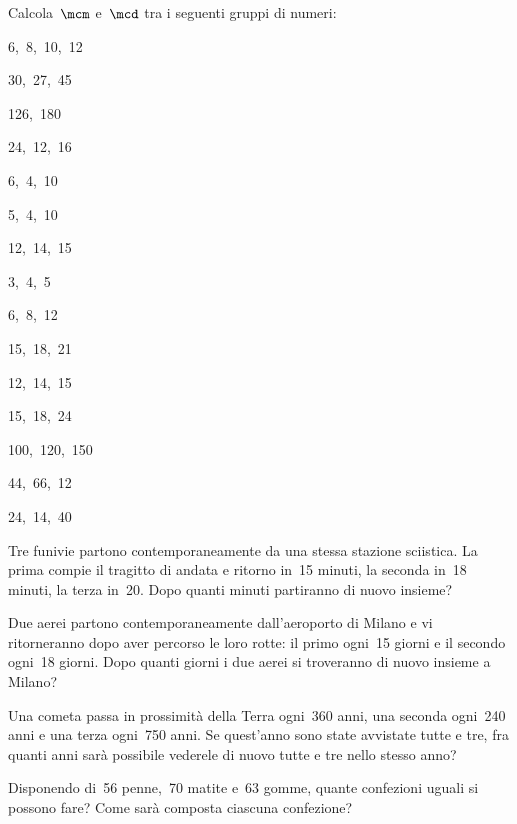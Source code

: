 \begin{esercizio}[\Ast]
\label{ese:1.22}
Calcola~$\mcm$ e~$\mcd$ tra i seguenti gruppi di numeri:
\begin{multicols}{3}
 \begin{enumeratea}
 \item 6,~8,~10,~12
 \item 30,~27,~45
 \item 126,~180
 \item 24,~12,~16
 \item 6,~4,~10
 \item 5,~4,~10
 \item 12,~14,~15
 \item 3,~4,~5
 \item 6,~8,~12
 \item 15,~18,~21
 \item 12,~14,~15
 \item 15,~18,~24
 \item 100,~120,~150
 \item 44,~66,~12
 \item 24,~14,~40
 \end{enumeratea}
\end{multicols}
\end{esercizio}

\begin{multicols}{2}
\begin{esercizio}[\Ast]
\label{ese:1.23}
 Tre funivie partono contemporaneamente da una stessa stazione sciistica. La prima compie il tragitto di
andata e ritorno in~15 minuti, la seconda in~18 minuti, la terza in~20. Dopo quanti minuti partiranno di nuovo
insieme?
\end{esercizio}

\begin{esercizio}[\Ast]
\label{ese:1.24}
 Due aerei partono contemporaneamente dall’aeroporto di Milano e vi ritorneranno dopo aver
percorso le loro rotte: il primo ogni~15 giorni e il secondo ogni~18 giorni. Dopo quanti giorni i due
aerei si troveranno di nuovo insieme a Milano?
\end{esercizio}

\begin{esercizio}[\Ast]
\label{ese:1.25}
 Una cometa passa in prossimità della Terra ogni~360 anni, una seconda ogni~240 anni e una terza ogni~750 anni.
 Se quest'anno sono state avvistate tutte e tre, fra quanti anni sarà possibile vederele di nuovo tutte e
tre nello stesso anno?
\end{esercizio}

\begin{esercizio}[\Ast]
\label{ese:1.26}
 Disponendo di~56 penne,~70 matite e~63 gomme, quante confezioni uguali si possono fare? Come sarà
composta ciascuna confezione?
\end{esercizio}
\end{multicols}

